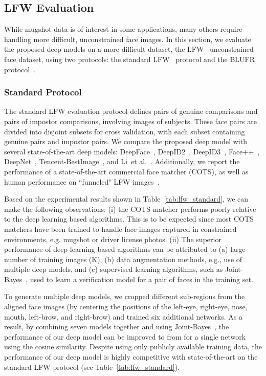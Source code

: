 \documentclass[10pt,journal,compsoc]{IEEEtran}
\newcommand{\etal}{et al.}
\begin{document}
\subsection{LFW Evaluation}
While mugshot data is of interest in some applications, many others require handling more difficult, unconstrained face images. In this section, we evaluate the proposed deep models on a more difficult dataset, the  LFW~\cite{DB:LFWTech} unconstrained face dataset, using two protocols: the standard LFW~\cite{DB:LFWTech} protocol and the BLUFR protocol~\cite{BLUFR}.

\subsubsection{Standard Protocol}\label{sec:lfw_protocol}
The standard LFW evaluation protocol defines  pairs of genuine comparisons and  pairs of impostor comparisons, involving  images of  subjects. These  face pairs are divided into  disjoint subsets for cross validation, with each subset containing  genuine pairs and  impostor pairs. We compare the proposed deep model with several state-of-the-art deep models: DeepFace~\cite{dl:deepface}, DeepID2~\cite{dl:deepID2}, DeepID3~\cite{dl:deepID3}, Face++~\cite{dl:face++}, DeepNet~\cite{dl:facenet}, Tencent-BestImage~\cite{dl:tencent}, and Li~\etal~\cite{DB:CASIA}. Additionally, we report the performance of a state-of-the-art commercial face matcher (COTS), as well as human performance on ``funneled" LFW images~\cite{align:funnel}.

Based on the experimental results shown in Table~\ref{tab:lfw_standard}, we can make the following observations: (i) the COTS matcher performs poorly relative to the deep learning based algorithms. This is to be expected since most COTS matchers have been trained to handle face images captured in constrained environments, e.g. mugshot or driver license photos. (ii) The superior performance of deep learning based algorithms can be attributed to (a) large number of training images (K), (b) data augmentation methods, e.g., use of multiple deep models, and (c) supervised learning algorithms, such as Joint-Bayes~\cite{ml:jointbayes}, used to learn a verification model for a pair of faces in the training set.

To generate multiple deep models, we cropped  different sub-regions from the aligned face images (by centering the positions of the left-eye, right-eye, nose, mouth, left-brow, and right-brow) and trained six additional networks. As a result, by combining seven models together and using Joint-Bayes~\cite{ml:jointbayes}, the performance of our deep model can be improved to  from  for a single network using the cosine similarity. Despite using only publicly available training data, the performance of our deep model is highly competitive with state-of-the-art on the standard LFW protocol (see Table~\ref{tab:lfw_standard}).
\end{document}
